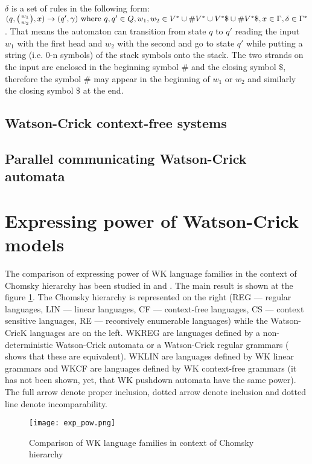 $\delta$ is a set of rules in the following form: $(q, \wkpair{w_1}{w_2}, x) \rightarrow (q', \gamma) \textnormal{ where } q, q' \in Q, w_1, w_2 \in V^* \cup \#V^* \cup V^*\$ \cup \#V^*\$, x \in \Gamma, \delta \in \Gamma^*$. That means the automaton can transition from state $q$ to $q'$ reading the input $w_1$ with the first head and $w_2$ with the second and go to state $q'$ while putting a string (i.e. 0-n symbols) of the stack symbols onto the stack. The two strands on the input are enclosed in the beginning symbol $\#$ and the closing symbol $\$$, therefore the symbol $\#$ may appear in the beginning of $w_1$ or $w_2$ and similarly the closing symbol $\$$ at the end.




\subsection{Watson-Crick context-free systems}
\cite{WKCF_SYSTEMS}

\subsection{Parallel communicating Watson-Crick automata}
\cite{PARALLEL}

\section{Expressing power of Watson-Crick models}

The comparison of expressing power of WK language families in the context of Chomsky hierarchy has been studied in \cite{WK_GRAMMARS_1} and \cite{WK_GRAMMARS_2}. The main result is shown at the figure \ref{fig:expr-power}. The Chomsky hierarchy is represented on the right (REG --- regular languages, LIN --- linear languages, CF --- context-free languages, CS --- context sensitive languages, RE --- recorsively enumerable languages) while the Watson-CricK languages are on the left. WKREG are languages defined by a non-deterministic Watson-Crick automata or a Watson-Crick regular grammars (\cite{REG_GRAMMAR} shows that these are equivalent). WKLIN are languages defined by WK linear grammars and WKCF are languages defined by WK context-free grammars (it has not been shown, yet, that WK pushdown automata have the same power). The full arrow denote proper inclusion, dotted arrow denote inclusion and dotted line denote incomparability.

\begin{figure}[ht]
  \texttt{[image: exp\_pow.png]}
  \centering
  \label{fig:expr-power}
  \caption{Comparison of WK language families in context of Chomsky hierarchy}
\end{figure}

